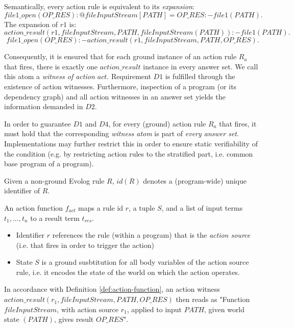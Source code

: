 \begin{definition}
\label{def:action-rule-expansion}
Semantically, every action rule is equivalent to its \emph{expansion}:
\[
file1\_open(OP\_RES) : @fileInputStream[PATH] = OP\_RES :- file1(PATH). %
\]
The expansion of $r1$ is:
\[
action\_result(r1, fileInputStream, PATH, fileInputStream(PATH)) :- file1(PATH). 
\]
\[
file1\_open(OP\_RES) :- action\_result(r1, fileInputStream, PATH, OP\_RES).
\]
\end{definition}
Consequently, it is ensured that for each ground instance of an action rule $R_a$ that fires, there is exactly one $action\_result$ instance in every answer set. We call this atom a \emph{witness of action $act$}. Requirement $D1$ is fulfilled through the existence of action witnesses. Furthermore, inspection of a program (or its dependency graph) and all action witnesses in an answer set yields the information demanded in $D2$.

\begin{definition}
\label{def:action-rule-applicability}
In order to guarantee $D1$ and $D4$, for every (ground) action rule $R_a$ that fires, it must hold that the corresponding \emph{witness atom} is part of \emph{every answer set}.
Implementations may further restrict this in order to ensure static verifiability of the condition (e.g. by restricting action rules to  the stratified part, i.e. common base program of a program).
\end{definition}

\begin{definition}
\label{def:rule-id}
Given a non-ground Evolog rule $R$, $id(R)$ denotes a (program-wide) unique identifier of $R$.
\end{definition}

\begin{definition}
\label{def:action-function}
An action function $f_{act}$ maps a rule id $r$, a tuple $S$, and a list of input terms $t_1,\ldots, t_n$ to a result term $t_{res}$.
\begin{itemize}
	\item Identifier $r$ references the rule (within a program) that is the \emph{action source} (i.e. that fires in order to trigger the action)
	\item State $S$ is a ground susbtitution for all body variables of the action source rule, i.e. it encodes the state of the world on which the action operates.
\end{itemize}
\end{definition}
In accordance with Definition \ref{def:action-function}, an action witness $action\_result(r_1, fileInputStream, PATH, OP\_RES)$ then reads as "Function $fileInputStream$, with action source $r_1$, applied to input $PATH$, given world state $(PATH)$, gives result $OP\_RES$".

